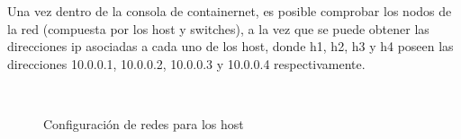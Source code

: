 \documentclass[10pt]{article}
\begin{document}
\noindent
Una vez dentro de la consola de containernet, es posible comprobar los nodos de la red (compuesta por los host y switches), a la vez que se puede obtener las direcciones ip asociadas a cada uno de los host, donde h1, h2, h3 y h4 poseen las direcciones 10.0.0.1, 10.0.0.2, 10.0.0.3 y 10.0.0.4 respectivamente. \newline

\begin{figure}[H]
    \centering
    \\
    \caption{Configuración de redes para los host}
    \label{fig:item01pinghost}
\end{figure}
\end{document}
